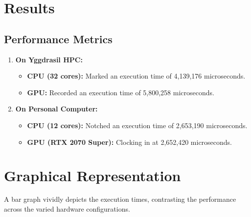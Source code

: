 \documentclass[11pt]{article}
\begin{document}
    \hypertarget{results}{%
    \section{Results}\label{results}}

    \hypertarget{performance-metrics}{%
    \subsection{Performance Metrics}\label{performance-metrics}}

    \begin{enumerate}
    \def\labelenumi{\arabic{enumi}.}
    
    \item
    \textbf{On Yggdrasil HPC:}

    \begin{itemize}
    
    \item
        \textbf{CPU (32 cores):} Marked an execution time of 4,139,176
        microseconds.
    \item
        \textbf{GPU:} Recorded an execution time of 5,800,258 microseconds.
    \end{itemize}
    \item
    \textbf{On Personal Computer:}

    \begin{itemize}
    
    \item
        \textbf{CPU (12 cores):} Notched an execution time of 2,653,190
        microseconds.
    \item
        \textbf{GPU (RTX 2070 Super):} Clocking in at 2,652,420
        microseconds.
    \end{itemize}
    \end{enumerate}

    \newpage

    \hypertarget{graphical-representation}{%
    \section{Graphical Representation}\label{graphical-representation}}

    A bar graph vividly depicts the execution times, contrasting the
    performance across the varied hardware configurations.
\end{document}
